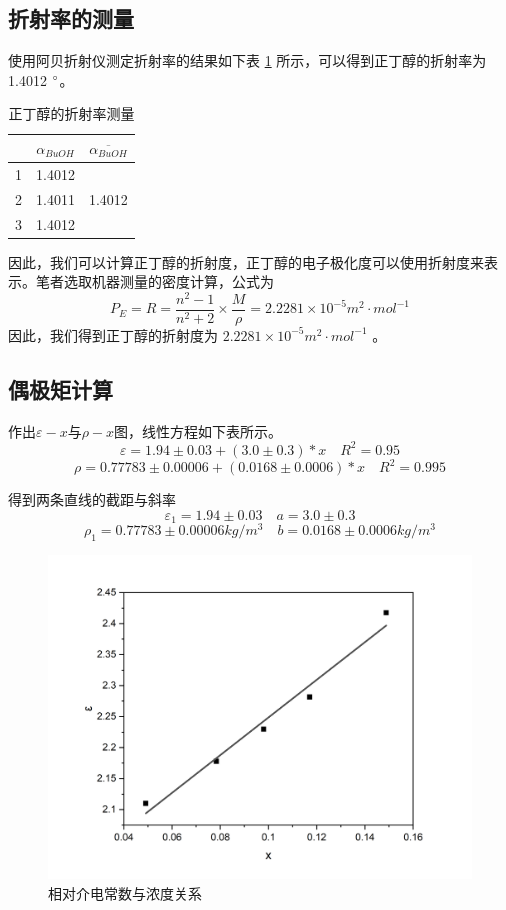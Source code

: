 \documentclass[cn,hazy,pku,12pt,normal,math=newtx,cite=super]{elegantnote}
\begin{document}
\subsection{折射率的测量}

使用阿贝折射仪测定折射率的结果如下表 \ref{06} 所示，可以得到正丁醇的折射率为 1.4012 $\degree$。

\begin{table}[h]
    \centering
    \caption{正丁醇的折射率测量}
    \label{06}
    \begin{tabular}{ccc}
    \hline
      & $\alpha_{BuOH}$ & $\overline{\alpha_{BuOH}}$ \\\hline
    1 & 1.4012          & \multirow{3}{*}{1.4012}    \\
    2 & 1.4011          &                            \\
    3 & 1.4012          &                           \\\hline
    \end{tabular}
\end{table}

因此，我们可以计算正丁醇的折射度，正丁醇的电子极化度可以使用折射度来表示。笔者选取机器测量的密度计算，公式为
\begin{equation}
    P_E = R = \frac{n^2-1}{n^2+2}\times\frac{M}{\rho} = 2.2281 \times 10^{-5} m^2\cdot mol^{-1}
\end{equation}
因此，我们得到正丁醇的折射度为 $2.2281 \times 10^{-5} m^2\cdot mol^{-1}$ 。

\subsection{偶极矩计算}
作出$\varepsilon - x$与$\rho - x$图，线性方程如下表所示。
$$
\varepsilon = 1.94 \pm 0.03 + (3.0 \pm 0.3) * x \quad R^2= 0.95
$$
$$
\rho = 0.77783 \pm 0.00006 + (0.0168 \pm 0.0006) * x \quad R^2= 0.995
$$

得到两条直线的截距与斜率
$$
\varepsilon_1 = 1.94 \pm 0.03 \quad a = 3.0 \pm 0.3
$$
$$
\rho_1 = 0.77783 \pm 0.00006 kg/m^3 \quad b = 0.0168 \pm 0.0006 kg/m^3
$$

\begin{figure}[htbp]
    \centering
    \includegraphics[width = .70\textwidth]{image/Graph6.png}
    \caption{相对介电常数与浓度关系}\label{3}
\end{figure}
\end{document}
